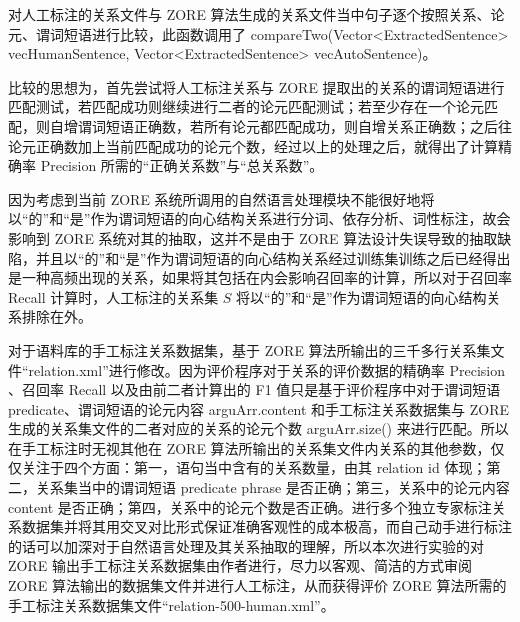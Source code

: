 对人工标注的关系文件与 ZORE 算法生成的关系文件当中句子逐个按照关系、论元、谓词短语进行比较，此函数调用了 compareTwo(Vector<ExtractedSentence> vecHumanSentence, Vector<ExtractedSentence> vecAutoSentence)。

比较的思想为，首先尝试将人工标注关系与 ZORE 提取出的关系的谓词短语进行匹配测试，若匹配成功则继续进行二者的论元匹配测试；若至少存在一个论元匹配，则自增谓词短语正确数，若所有论元都匹配成功，则自增关系正确数；之后往论元正确数加上当前匹配成功的论元个数，经过以上的处理之后，就得出了计算精确率 Precision 所需的“正确关系数”与“总关系数”。

因为考虑到当前 ZORE 系统所调用的自然语言处理模块不能很好地将以“的”和“是”作为谓词短语的向心结构关系进行分词、依存分析、词性标注，故会影响到 ZORE 系统对其的抽取，这并不是由于 ZORE 算法设计失误导致的抽取缺陷，并且以“的”和“是”作为谓词短语的向心结构关系经过训练集训练之后已经得出是一种高频出现的关系，如果将其包括在内会影响召回率的计算，所以对于召回率 Recall 计算时，人工标注的关系集 $S$ 将以“的”和“是”作为谓词短语的向心结构关系排除在外。

对于语料库的手工标注关系数据集，基于 ZORE 算法所输出的三千多行关系集文件“relation.xml”进行修改。因为评价程序对于关系的评价数据的精确率 Precision 、召回率 Recall 以及由前二者计算出的 F1 值只是基于评价程序中对于谓词短语 predicate、谓词短语的论元内容 arguArr.content 和手工标注关系数据集与 ZORE 生成的关系集文件的二者对应的关系的论元个数 arguArr.size() 来进行匹配。所以在手工标注时无视其他在 ZORE 算法所输出的关系集文件内关系的其他参数，仅仅关注于四个方面：第一，语句当中含有的关系数量，由其 relation id 体现；第二，关系集当中的谓词短语 predicate phrase 是否正确；第三，关系中的论元内容 content 是否正确；第四，关系中的论元个数是否正确。进行多个独立专家标注关系数据集并将其用交叉对比形式保证准确客观性的成本极高，而自己动手进行标注的话可以加深对于自然语言处理及其关系抽取的理解，所以本次进行实验的对 ZORE 输出手工标注关系数据集由作者进行，尽力以客观、简洁的方式审阅 ZORE 算法输出的数据集文件并进行人工标注，从而获得评价 ZORE 算法所需的手工标注关系数据集文件“relation-500-human.xml”。

